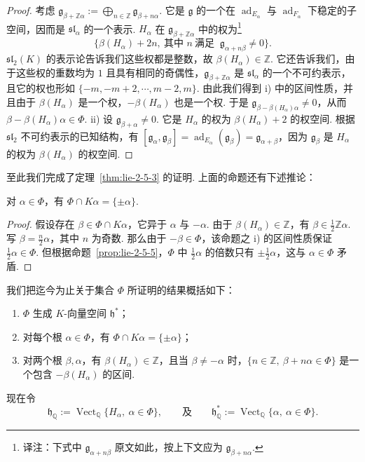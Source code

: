 \begin{proof}
考虑 $\mathfrak g_{\beta+\mathbb Z\alpha}:=\bigoplus_{n\in\mathbb Z}\mathfrak g_{\beta+n\alpha}$. 它是 $\mathfrak g$ 的一个在 $\operatorname{ad}_{E_{\alpha}}$ 与 $\operatorname{ad}_{F_{\alpha}}$ 下稳定的子空间，因而是 $\mathfrak{sl}_{\alpha}$ 的一个表示. $H_{\alpha}$ 在 $\mathfrak g_{\beta+\mathbb Z\alpha}$ 中的权为\footnote{译注：下式中 $\mathfrak g_{\alpha+n\beta}$ 原文如此，按上下文应为 $\mathfrak g_{\beta+n\alpha}$.}
\[
\{\beta(H_{\alpha})+2n,\ \text{其中 }n\ \text{满足 }\ \mathfrak g_{\alpha+n\beta}\neq0\}.
\]
$\mathfrak{sl}_{2}(K)$ 的表示论告诉我们这些权都是整数，故 $\beta(H_{\alpha})\in\mathbb Z$. 它还告诉我们，由于这些权的重数均为 $1$ 且具有相同的奇偶性，$\mathfrak g_{\beta+\mathbb Z\alpha}$ 是 $\mathfrak{sl}_{\alpha}$ 的一个不可约表示，且它的权也形如 $\{-m,-m+2,\cdots,m-2,m\}$. 由此我们得到 i) 中的区间性质，并且由于 $\beta(H_{\alpha})$ 是一个权，$-\beta(H_{\alpha})$ 也是一个权. 于是 $\mathfrak g_{\beta-\beta(H_{\alpha})\alpha}\neq0$，从而 $\beta-\beta(H_{\alpha})\alpha\in\Phi$.
ii) 设 $\mathfrak g_{\beta+\alpha}\neq0$. 它是 $H_{\alpha}$ 的权为 $\beta(H_{\alpha})+2$ 的权空间. 根据 $\mathfrak{sl}_{2}$ 不可约表示的已知结构，有 $[\mathfrak g_{\alpha},\mathfrak g_{\beta}]=\operatorname{ad}_{E_{\alpha}}(\mathfrak g_{\beta})=\mathfrak g_{\alpha+\beta}$，因为 $\mathfrak g_{\beta}$ 是 $H_{\alpha}$ 的权为 $\beta(H_{\alpha})$ 的权空间.
\end{proof}
至此我们完成了定理~\ref{thm:lie-2-5-3} 的证明. 上面的命题还有下述推论：
\begin{corollary*}
对 $\alpha\in\Phi$，有 $\Phi\cap K\alpha=\{\pm\alpha\}$.
\end{corollary*}
\begin{proof}
假设存在 $\beta\in\Phi\cap K\alpha$，它异于 $\alpha$ 与 $-\alpha$. 由于 $\beta(H_{\alpha})\in\mathbb Z$，有 $\beta\in\frac{1}{2}\mathbb Z\alpha$. 写 $\beta=\frac{n}{2}\alpha$，其中 $n$ 为奇数. 那么由于 $-\beta\in\Phi$，该命题之 i) 的区间性质保证 $\frac{1}{2}\alpha\in\Phi$. 但根据命题~\ref{prop:lie-2-5-5}，$\Phi$ 中 $\frac{1}{2}\alpha$ 的倍数只有 $\pm\frac{1}{2}\alpha$，这与 $\alpha\in\Phi$ 矛盾.
\end{proof}
\begin{numpara}\label{np:lie-2-5-7}
我们把迄今为止关于集合 $\Phi$ 所证明的结果概括如下：
\begin{enumerate}[label=\roman*)]
\item $\Phi$ 生成 $K$-向量空间 $\mathfrak h^{*}$；
\item 对每个根 $\alpha\in\Phi$，有 $\Phi\cap K\alpha=\{\pm\alpha\}$；
\item 对两个根 $\beta,\alpha$，有 $\beta(H_{\alpha})\in\mathbb Z$，且当 $\beta\neq-\alpha$ 时，$\{n\in\mathbb Z,\ \beta+n\alpha\in\Phi\}$ 是一个包含 $-\beta(H_{\alpha})$ 的区间.
\end{enumerate}
现在令
\[
\mathfrak h_{\mathbb Q}:=\operatorname{Vect}_{\mathbb Q}\{H_{\alpha},\ \alpha\in\Phi\},\qquad\text{及}\qquad\mathfrak h^{*}_{\mathbb Q}:=\operatorname{Vect}_{\mathbb Q}\{\alpha,\ \alpha\in\Phi\}.
\]
\end{numpara}
